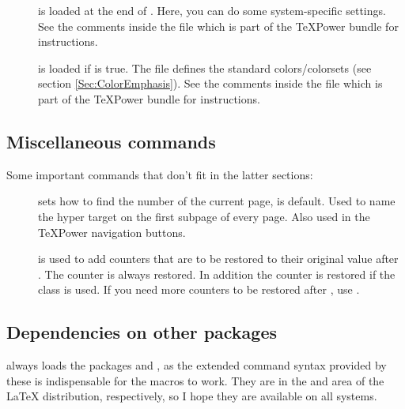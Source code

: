 \begin{slide}
\begin{description}
\item[]
  is loaded at the end of . Here, you can do some
  system-specific settings. See the comments inside the
  file  which is part of the
  \TeX Power bundle for instructions.

\item[]
  is loaded if  is true. The file defines the standard
  colors/colorsets (see section \ref{Sec:ColorEmphasis}). See the
  comments inside the file  which is part of the
  \TeX Power bundle for instructions.
\end{description}

\newslide

\subsection{Miscellaneous commands}\label{Sec:MiscCmd}
Some important commands that don't fit in the latter sections:
\begin{description}
\item[]
  sets how to find the number of the current page,  is default.
  Used to name the hyper target on the first subpage of every page. Also used in the
  TeXPower navigation buttons.
\item[]
  is used to add counters that are to be restored to their original value after . The 
  counter is always restored. In addition the  counter is restored if the  class is used. If
  you need more counters to be restored after , use .
\end{description}

\newslide

\subsection{Dependencies on other packages}
 always loads the packages  and , as the extended command syntax provided by
these is indispensable for the macros to work. They are in the  and  area of the \LaTeX{}
distribution, respectively, so I hope they are available on all systems.


\end{slide}

